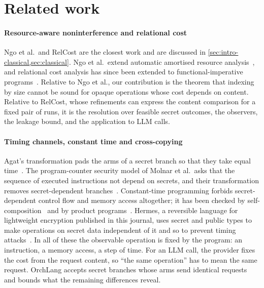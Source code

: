 \section{Related work}\label{sec:related}

\paragraph{Resource-aware noninterference and relational cost} Ngo et al.\ and RelCost
are the closest work and are discussed in \cref{sec:intro-classical,sec:classical}.
Ngo et al.\ extend automatic amortised resource
analysis~\cite{hofmann2003static,hoffmann2012multivariate}, and relational cost analysis
has since been extended to functional-imperative programs~\cite{Qu2019ARel}. Relative to
Ngo et al., our contribution is the theorem that indexing by size cannot be sound for
opaque operations whose cost depends on content. Relative to RelCost, whose refinements
can express the content comparison for a fixed pair of runs, it is the resolution over
feasible secret outcomes, the observers, the leakage bound, and the application to LLM
calls.

\paragraph{Timing channels, constant time and cross-copying} Agat's transformation pads
the arms of a secret branch so that they take equal time~\cite{agat2000transforming}.
The program-counter security model of Molnar et al.\ asks that the sequence of executed
instructions not depend on secrets, and their transformation removes secret-dependent
branches~\cite{molnar2006program}. Constant-time programming forbids secret-dependent
control flow and memory access altogether; it has been checked by
self-composition~\cite{BacelarAlmeida2013SelfComp} and by product
programs~\cite{Almeida2016ConstantTime}. Hermes, a
reversible language for lightweight encryption published in this journal, uses secret and
public types to make operations on secret data independent of it and so to prevent
timing attacks~\cite{Mogensen2022Hermes}. In all of these the observable operation is
fixed by the program: an instruction, a memory access, a step of time. For an LLM call,
the provider fixes the cost from the request content, so ``the same operation'' has to
mean the same request. OrchLang accepts secret branches whose arms send identical
requests and bounds what the remaining differences reveal.


